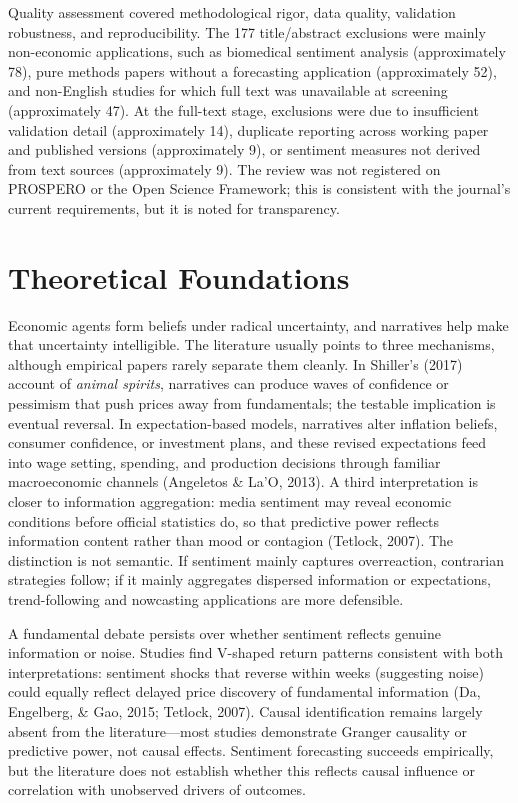 \documentclass[12pt,oneside]{article}
\begin{document}
Quality assessment covered methodological rigor, data quality, validation robustness, and reproducibility. The 177 title/abstract exclusions were mainly non-economic applications, such as biomedical sentiment analysis (approximately 78), pure methods papers without a forecasting application (approximately 52), and non-English studies for which full text was unavailable at screening (approximately 47). At the full-text stage, exclusions were due to insufficient validation detail (approximately 14), duplicate reporting across working paper and published versions (approximately 9), or sentiment measures not derived from text sources (approximately 9). The review was not registered on PROSPERO or the Open Science Framework; this is consistent with the journal's current requirements, but it is noted for transparency.

\section{Theoretical Foundations}

Economic agents form beliefs under radical uncertainty, and narratives help make that uncertainty intelligible. The literature usually points to three mechanisms, although empirical papers rarely separate them cleanly. In Shiller's (2017) account of \textit{animal spirits}, narratives can produce waves of confidence or pessimism that push prices away from fundamentals; the testable implication is eventual reversal. In expectation-based models, narratives alter inflation beliefs, consumer confidence, or investment plans, and these revised expectations feed into wage setting, spending, and production decisions through familiar macroeconomic channels (Angeletos \& La'O, 2013). A third interpretation is closer to information aggregation: media sentiment may reveal economic conditions before official statistics do, so that predictive power reflects information content rather than mood or contagion (Tetlock, 2007). The distinction is not semantic. If sentiment mainly captures overreaction, contrarian strategies follow; if it mainly aggregates dispersed information or expectations, trend-following and nowcasting applications are more defensible.

A fundamental debate persists over whether sentiment reflects genuine information or noise. Studies find V-shaped return patterns consistent with both interpretations: sentiment shocks that reverse within weeks (suggesting noise) could equally reflect delayed price discovery of fundamental information (Da, Engelberg, \& Gao, 2015; Tetlock, 2007). Causal identification remains largely absent from the literature---most studies demonstrate Granger causality or predictive power, not causal effects. Sentiment forecasting succeeds empirically, but the literature does not establish whether this reflects causal influence or correlation with unobserved drivers of outcomes.
\end{document}
